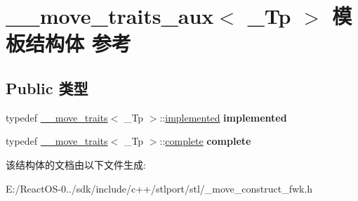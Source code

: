 \hypertarget{struct____move__traits__aux}{}\section{\+\_\+\+\_\+move\+\_\+traits\+\_\+aux$<$ \+\_\+\+Tp $>$ 模板结构体 参考}
\label{struct____move__traits__aux}
\subsection*{Public 类型}
\begin{DoxyCompactItemize}
\item 
\mbox{\label{struct____move__traits__aux_a00635f4c490b4bf8ae7d565d7b58dc44}} 
typedef \hyperlink{struct____move__traits}{\+\_\+\+\_\+move\+\_\+traits}$<$ \+\_\+\+Tp $>$\+::\hyperlink{struct____false__type}{implemented} {\bfseries implemented}
\item 
\mbox{\label{struct____move__traits__aux_a95ec9bcb300e7b8f78a3e23d7e9c97e9}} 
typedef \hyperlink{struct____move__traits}{\+\_\+\+\_\+move\+\_\+traits}$<$ \+\_\+\+Tp $>$\+::\hyperlink{struct____true__type}{complete} {\bfseries complete}
\end{DoxyCompactItemize}


该结构体的文档由以下文件生成\+:\begin{DoxyCompactItemize}
\item 
E\+:/\+React\+O\+S-\/0../sdk/include/c++/stlport/stl/\+\_\+move\+\_\+construct\+\_\+fwk.\+h\end{DoxyCompactItemize}
